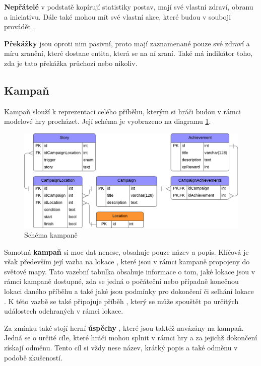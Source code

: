 \textbf{Nepřátelé} v podstatě kopírují statistiky postav, mají své vlastní zdraví, obranu a iniciativu. Dále také mohou mít své vlastní akce, které budou v souboji provádět .

\textbf{Překážky} jsou oproti nim pasivní, proto mají zaznamenané pouze své zdraví a míru zranění, které dostane entita, která se na ní zraní. Také má indikátor toho, zda je tato překážka průchozí  nebo nikoliv.


\subsection{Kampaň}
\label{subsec:schema_campaign}

Kampaň slouží k reprezentaci celého příběhu, kterým si hráči budou v rámci modelové hry procházet. Její schéma je vyobrazeno na diagramu \ref{diag:er_campaign}.

\begin{figure}[h]
    \centering
    \includegraphics[scale=0.8]{../../shared/diagrams/er_campaign.pdf}
    \caption{Schéma kampaně}
    \label{diag:er_campaign}
\end{figure}

Samotná \textbf{kampaň} si moc dat nenese, obsahuje pouze název a popis. Klíčová je však především její vazba na lokace , které jsou v rámci kampaně propojeny do světové mapy. Tato vazební tabulka obsahuje informace o tom, jaké lokace jsou v rámci kampaně dostupné, zda se jedná o počáteční  nebo případně konečnou  lokaci daného příběhu a také jaké jsou podmínky pro dokončení či selhání lokace . K této vazbě se také připojuje příběh , který se může spouštět po určitých událostech odehraných v rámci lokace.

Za zmínku také stojí herní \textbf{úspěchy} , které jsou taktéž navázány na kampaň. Jedná se o určité cíle, které hráči mohou splnit v rámci hry a za jejichž dokončení získají odměnu. Tento cíl si vždy nese název, krátký popis a také odměnu v podobě zkušeností.


